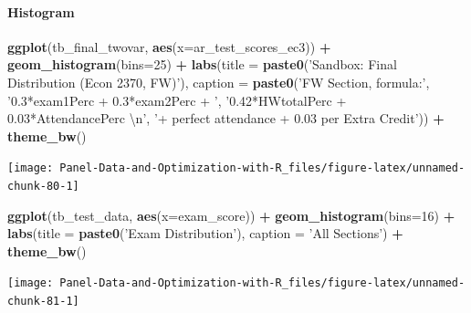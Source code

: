 \documentclass[
]{book}
\newenvironment{Shaded}{\begin{snugshade}}{\end{snugshade}}
\newcommand{\CharTok}[1]{\textcolor[rgb]{0.31,0.60,0.02}{#1}}
\newcommand{\DataTypeTok}[1]{\textcolor[rgb]{0.13,0.29,0.53}{#1}}
\newcommand{\DecValTok}[1]{\textcolor[rgb]{0.00,0.00,0.81}{#1}}
\newcommand{\KeywordTok}[1]{\textcolor[rgb]{0.13,0.29,0.53}{\textbf{#1}}}
\newcommand{\NormalTok}[1]{#1}
\newcommand{\OperatorTok}[1]{\textcolor[rgb]{0.81,0.36,0.00}{\textbf{#1}}}
\newcommand{\StringTok}[1]{\textcolor[rgb]{0.31,0.60,0.02}{#1}}
\begin{document}
\hypertarget{histogram-1}{%
\paragraph{Histogram}\label{histogram-1}}

\begin{Shaded}
\begin{Highlighting}[]
\KeywordTok{ggplot}\NormalTok{(tb_final_twovar, }\KeywordTok{aes}\NormalTok{(}\DataTypeTok{x=}\NormalTok{ar_test_scores_ec3)) }\OperatorTok{+}
\StringTok{  }\KeywordTok{geom_histogram}\NormalTok{(}\DataTypeTok{bins=}\DecValTok{25}\NormalTok{) }\OperatorTok{+}
\StringTok{  }\KeywordTok{labs}\NormalTok{(}\DataTypeTok{title =} \KeywordTok{paste0}\NormalTok{(}\StringTok{'Sandbox: Final Distribution (Econ 2370, FW)'}\NormalTok{),}
       \DataTypeTok{caption =} \KeywordTok{paste0}\NormalTok{(}\StringTok{'FW Section, formula:'}\NormalTok{,}
                        \StringTok{'0.3*exam1Perc + 0.3*exam2Perc + '}\NormalTok{,}
                        \StringTok{'0.42*HWtotalPerc + 0.03*AttendancePerc }\CharTok{\textbackslash{}n}\StringTok{'}\NormalTok{,}
                        \StringTok{'+ perfect attendance + 0.03 per Extra Credit'}\NormalTok{)) }\OperatorTok{+}
\StringTok{  }\KeywordTok{theme_bw}\NormalTok{()}
\end{Highlighting}
\end{Shaded}

\begin{center}\texttt{[image: Panel-Data-and-Optimization-with-R\_files/figure-latex/unnamed-chunk-80-1]} \end{center}

\begin{Shaded}
\begin{Highlighting}[]
\KeywordTok{ggplot}\NormalTok{(tb_test_data, }\KeywordTok{aes}\NormalTok{(}\DataTypeTok{x=}\NormalTok{exam_score)) }\OperatorTok{+}
\StringTok{  }\KeywordTok{geom_histogram}\NormalTok{(}\DataTypeTok{bins=}\DecValTok{16}\NormalTok{) }\OperatorTok{+}
\StringTok{  }\KeywordTok{labs}\NormalTok{(}\DataTypeTok{title =} \KeywordTok{paste0}\NormalTok{(}\StringTok{'Exam Distribution'}\NormalTok{),}
       \DataTypeTok{caption =} \StringTok{'All Sections'}\NormalTok{) }\OperatorTok{+}
\StringTok{  }\KeywordTok{theme_bw}\NormalTok{()}
\end{Highlighting}
\end{Shaded}

\begin{center}\texttt{[image: Panel-Data-and-Optimization-with-R\_files/figure-latex/unnamed-chunk-81-1]} \end{center}
\end{document}
